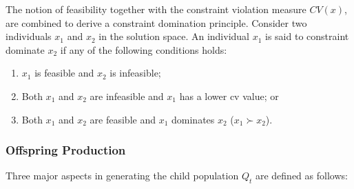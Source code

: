 The notion of feasibility together with the constraint violation measure $CV(x)$, are combined to derive a constraint domination principle. Consider two individuals $x_1$ and $x_2$ in the solution space. An individual $x_1$ is said to constraint dominate $x_2$ if any of the following conditions holds:
\begin{enumerate}
    \item $x_1$ is feasible and $x_2$ is infeasible;
    \item Both $x_1$ and $x_2$ are infeasible and $x_1$ has a lower \gls{cv} value; or
    \item Both $x_1$ and $x_2$ are feasible and $x_1$ dominates $x_2$ ($x_1 \succ x_2$).
\end{enumerate}




\subsubsection{Offspring Production}
Three major aspects in generating the child population $Q_t$ are defined as follows:


